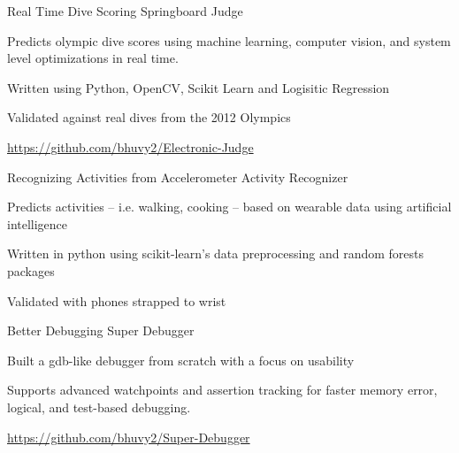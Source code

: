 
\begin{cventries}

  \cventry
    {Real Time Dive Scoring}
    {Springboard Judge}
    {} %
    {} %
    {
      \begin{cvitems} %
        \item {Predicts olympic dive scores using machine learning, computer vision, and system level optimizations in real time.}
        \item {Written using Python, OpenCV, Scikit Learn and Logisitic Regression}
        \item {Validated against real dives from the 2012 Olympics}
        \item {\href{https://github.com/bhuvy2/Electronic-Judge}{https://github.com/bhuvy2/Electronic-Judge}}
      \end{cvitems}
    }

  \cventry
    {Recognizing Activities from Accelerometer}
    {Activity Recognizer}
    {} %
    {} %
    {
      \begin{cvitems} %
        \item {Predicts activities -- i.e. walking, cooking -- based on wearable data using artificial intelligence}
        \item {Written in python using scikit-learn’s data preprocessing and random forests packages}
        \item {Validated with phones strapped to wrist}
      \end{cvitems}
    }

   
  \cventry
    {Better Debugging}
    {Super Debugger}
    {} %
    {} %
    {
      \begin{cvitems} %
        \item {Built a gdb-like debugger from scratch with a focus on usability}
        \item {Supports advanced watchpoints and assertion tracking for faster memory error, logical, and test-based debugging.}
        \item {\href{https://github.com/bhuvy2/Super-Debugger}{https://github.com/bhuvy2/Super-Debugger}}
      \end{cvitems}
    }


\end{cventries}
